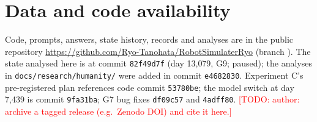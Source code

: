 \documentclass[11pt]{article}
\newcommand{\todo}[1]{\textcolor{red}{[TODO: #1]}}
\begin{document}
\section*{Data and code availability}
Code, prompts, answers, state history, records and analyses are in the public repository \url{https://github.com/Ryo-Tanohata/RobotSimulaterRyo} (branch ). The state analysed here is at commit \texttt{82f49d7f} (day 13{,}079, G9; paused); the analyses in \texttt{docs/research/humanity/} were added in commit \texttt{e4682830}. Experiment C's pre-registered plan references code commit \texttt{53780be}; the model switch at day 7{,}439 is commit \texttt{9fa31ba}; G7 bug fixes \texttt{df09c57} and \texttt{4adff80}. \todo{author: archive a tagged release (e.g.\ Zenodo DOI) and cite it here.}




\appendix
\end{document}
